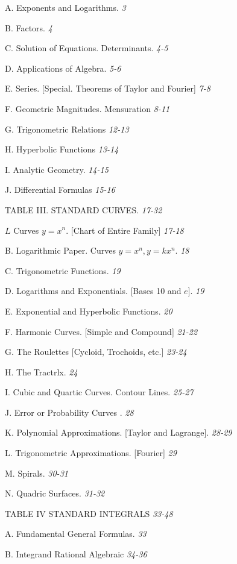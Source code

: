 \documentclass[12pt]{article}
\begin{document}
A. Exponents and Logarithms. {\it 3}

B. Factors. {\it 4}

C. Solution of Equations. Determinants. {\it 4-5}

D. Applications of Algebra. {\it 5-6}

E. Series. [Special. Theorems of Taylor and Fourier] {\it 7-8}

F. Geometric Magnitudes. Mensuration {\it 8-11}

G. Trigonometric Relations {\it 12-13}

H. Hyperbolic Functions {\it 13-14}

I. Analytic Geometry. {\it 14-15}

J. Differential Formulas {\it 15-16}

\begin{center}
TABLE III. STANDARD CURVES. {\it 17-32}
\end{center}

$L$ Curves $ y=x^{n}$. [Chart of Entire Family] {\it 17-18}

B. Logarithmic Paper. Curves $y=x^{n}, y=kx^{n}$. {\it 18}

C. Trigonometric Functions. {\it 19}

D. Logarithms and Exponentials. [Bases 10 and $e$]. {\it 19}

E. Exponential and Hyperbolic Functions. {\it 20}

F. Harmonic Curves. [Simple and Compound] {\it 21-22}

G. The Roulettes [Cycloid, Trochoids, etc.] {\it 23-24}

H. The Tractrlx. {\it 24}

I. Cubic and Quartic Curves. Contour Lines. {\it 25-27}

J. Error or Probability Curves . {\it 28}

K. Polynomial Approximations. [Taylor and Lagrange]. {\it 28-29}

L. Trigonometric Approximations. [Fourier] {\it 29}

M. Spirals. {\it 30-31}

N. Quadric Surfaces. {\it 31-32}

\begin{center}
TABLE IV STANDARD INTEGRALS {\it 33-48}
\end{center}

A. Fundamental General Formulas. {\it 33}

B. Integrand Rational Algebraic {\it 34-36}
\end{document}
